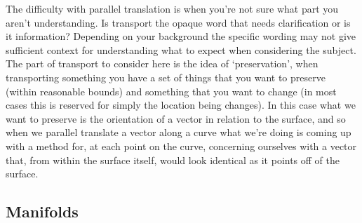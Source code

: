 The difficulty with parallel translation is when you're not sure what part you aren't understanding. Is transport the opaque word that needs clarification or is it information? Depending on your background the specific wording may not give sufficient context for understanding what to expect when considering the subject. The part of transport to consider here is the idea of `preservation', when transporting something you have a set of things that you want to preserve (within reasonable bounds) and something that you want to change (in most cases this is reserved for simply the location being changes). In this case what we want to preserve is the orientation of a vector in relation to the surface, and so when we parallel translate a vector along a curve what we're doing is coming up with a method for, at each point on the curve, concerning ourselves with a vector that, from within the surface itself, would look identical as it points off of the surface.





\subsection{Manifolds}